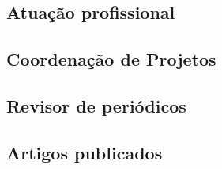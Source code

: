 \subsection{Atuação profissional}





\subsection{Coordenação de Projetos}






\subsection{Revisor de periódicos}







\subsection{Artigos publicados}






